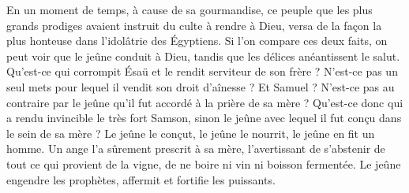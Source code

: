  En un moment de temps, à cause de sa gourmandise, ce peuple que les plus grands prodiges avaient instruit du culte à rendre à Dieu, versa de la façon la plus honteuse dans l’idolâtrie des Égyptiens. Si l’on compare ces deux faits, on peut voir que le jeûne conduit à Dieu, tandis que les délices anéantissent le salut. Qu’est-ce qui corrompit Ésaü et le rendit serviteur de son frère ? N’est-ce pas un seul mets pour lequel il vendit son droit d’aînesse ? Et Samuel ? N’est-ce pas au contraire par le jeûne qu’il fut accordé à la prière de sa mère ? Qu’est-ce donc qui a rendu invincible le très fort Samson, sinon le jeûne avec lequel il fut conçu dans le sein de sa mère ? Le jeûne le conçut, le jeûne le nourrit, le jeûne en fit un homme. Un ange l’a sûrement prescrit à sa mère, l’avertissant de s’abstenir de tout ce qui provient de la vigne, de ne boire ni vin ni boisson fermentée. Le jeûne engendre les prophètes, affermit et fortifie les puissants.